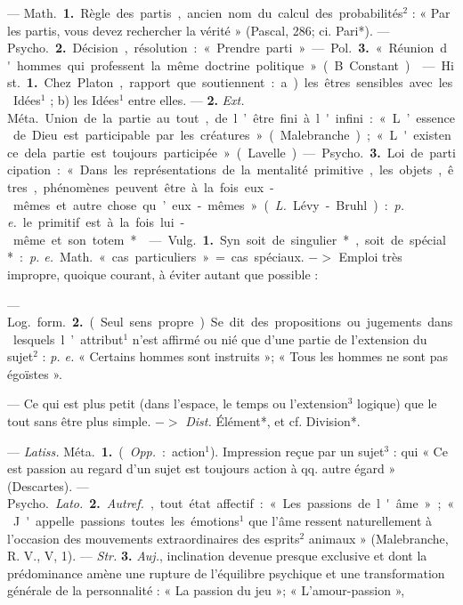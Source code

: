 \begin{itemize}[leftmargin=1cm, label=, itemsep=1pt]
 — \si{Math.} {\bf 1.} Règle des partis,
ancien nom du calcul des probabilités$^2$ : « Par les partis, vous devez
rechercher la vérité » (Pascal, 286;
ci. Pari*). — \si{Psycho.} {\bf 2.} Décision,
résolution : « Prendre parti » —
\si{Pol.} {\bf 3.} « Réunion d'hommes qui
professent la même doctrine politique » (B. Constant).

 — \si{Hist.} {\bf 1.} Chez Platon,
rapport que soutiennent : a) les
êtres sensibles avec les Idées$^1$ ; b) les
Idées$^1$ entre elles. — {\bf 2.} {\it Ext.} \si{Méta.}
Union de la partie au tout, de l’être
fini à l'infini : « L’essence de Dieu
est participable par les créatures »
(Malebranche) ; « L'existence dela partie est toujours participée » (Lavelle).

— \si{Psycho.} {\bf 3.} Loi de participation : « Dans les représentations de la
mentalité primitive, les objets, êtres,
phénomènes peuvent être à la fois
eux-mêmes et autre chose qu’eux-mêmes » ({\it L.} Lévy-Bruhl) : {\it p. e.} le
primitif est à la fois lui-même et son
totem*.

 — \si{Vulg.} {\bf 1.} Syn. soit de
singulier*, soit de spécial* : {\it p. e.}
\si{Math.} « cas particuliers » = cas
spéciaux. $->$ Emploi très impropre,
quoique courant, à éviter autant
que possible :

— \si{Log.} \si{form.} {\bf 2.} (Seul sens propre). Se dit des propositions ou jugements dans lesquels l’attribut$^1$
n'est affirmé ou nié que d’une
partie de l’extension du sujet$^2$ : {\it p. e.}
« Certains hommes sont instruits »;
« Tous les hommes ne sont pas
égoïstes ».

 — Ce qui est plus petit (dans
l'espace, le temps ou l'extension$^3$
logique) que le tout sans être plus
simple. $->$ {\it Dist.} Élément*, et cf.
Division*.

 — {\it Latiss.} \si{Méta.} {\bf 1.} ({\it Opp.} :
action$^1$). Impression reçue par un
sujet$^3$ : qui « Ce est passion au
regard d’un sujet est toujours action
à qq. autre égard » (Descartes). —
\si{Psycho.} {\it Lato.} {\bf 2.} {\it Autref.}, tout état
affectif : « Les passions de l'âme » ;
« J'appelle passions toutes les émotions$^1$ que l’âme ressent naturellement à l’occasion des mouvements
extraordinaires des esprits$^2$ animaux » (Malebranche, R. V., V, 1).
— {\it Str.} {\bf 3.} {\it Auj.}, inclination devenue
presque exclusive et dont la prédominance amène une rupture de
l'équilibre psychique et une transformation générale de la personnalité : « La passion du jeu »; « L'amour-passion »,


\end{itemize}
